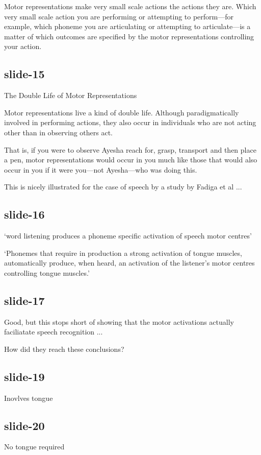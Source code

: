 \documentclass[12pt,\papersize]{extarticle}
\begin{document}
Motor representations make very small scale actions the actions they are.
Which very small scale action you are performing or attempting to perform---for example,
which phoneme you are articulating or attempting to articulate---is a matter of which
outcomes are specified by the motor representations controlling your action.

\subsection{slide-15}
The Double Life of Motor Representations

Motor representations live a kind of double life. Although paradigmatically involved in performing
actions, they also occur in individuals who are not acting other than in observing others act.

That is, if you were to observe Ayesha reach for, grasp, transport and then place a pen, motor
representations would occur in you much like those that would also occur in you if it were you---not
Ayesha---who was doing this.

This is nicely illustrated for the case of speech by a study by Fadiga et al ...

\subsection{slide-16}
‘word listening produces a phoneme specific activation of speech motor centres’ \citep{Fadiga:2002kl}



‘Phonemes that require in production a strong activation of tongue muscles, automatically produce, when heard, an activation of the listener's motor centres controlling tongue muscles.’ \citep{Fadiga:2002kl}


\subsection{slide-17}
Good, but this stops short of showing that the motor activations
actually faciliatate speech recognition ...

How did they reach these conclusions?

\subsection{slide-19}
Inovlves tongue

\subsection{slide-20}
No tongue required
\end{document}

